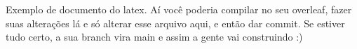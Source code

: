 \documentclass[a4paper,12pt]{article}
\begin{document}
Exemplo de documento do latex. Aí você poderia compilar no seu overleaf, fazer suas alterações lá e só alterar
esse arquivo aqui, e então dar commit. Se estiver tudo certo, a sua branch vira main e assim a gente vai construindo :)
\end{document}

